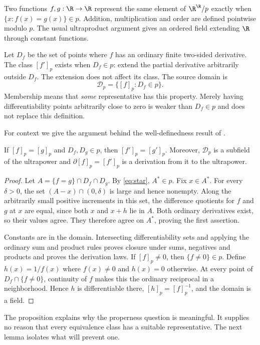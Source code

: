 \documentclass[11pt]{article}
\begin{document}
Two functions $f,g:\R\to\R$ represent the same element of
$\R^{\R}/p$ exactly when $\{x:f(x)=g(x)\}\in p$. Addition,
multiplication and order are defined pointwise modulo $p$. The usual
ultraproduct argument gives an ordered field extending $\R$ through
constant functions.

Let $D_f$ be the set of points where $f$ has an ordinary finite two-sided
derivative. The class $[f']_p$ exists when $D_f\in p$: extend the partial
derivative arbitrarily outside $D_f$. The extension does not affect its
class. The source domain is
\begin{equation}\label{eq:domain}
 \mathcal D_p=\{[f]_p:D_f\in p\}.
\end{equation}
Membership means that \emph{some} representative has this property.
Merely having differentiability points arbitrarily close to zero is
weaker than $D_f\in p$ and does not replace this definition.

For context we give the argument behind the well-definedness result
of \cite[Theorem~9]{AD}.

\begin{proposition}\label{prop:well-defined}
If $[f]_p=[g]_p$ and $D_f,D_g\in p$, then $[f']_p=[g']_p$.
Moreover, $\mathcal D_p$ is a subfield of the ultrapower and
$\partial[f]_p=[f']_p$ is a derivation from it to the ultrapower.
\end{proposition}
\begin{proof}
Let $A=\{f=g\}\cap D_f\cap D_g$. By \eqref{eq:star}, $A^*\in p$.
Fix $x\in A^*$. For every $\delta>0$, the set
$(A-x)\cap(0,\delta)$ is large and hence nonempty. Along the arbitrarily
small positive increments in this set, the difference quotients for
$f$ and $g$ at $x$ are equal, since both $x$ and $x+h$ lie in $A$.
Both ordinary derivatives exist, so their values agree. They therefore
agree on $A^*$, proving the first assertion.

Constants are in the domain. Intersecting differentiability sets and
applying the ordinary sum and product rules proves closure under sums,
negatives and products and proves the derivation laws. If $[f]_p\ne0$,
then $\{f\ne0\}\in p$. Define $h(x)=1/f(x)$ where $f(x)\ne0$ and
$h(x)=0$ otherwise. At every point of $D_f\cap\{f\ne0\}$, continuity
of $f$ makes this the ordinary reciprocal in a neighborhood. Hence $h$
is differentiable there, $[h]_p=[f]_p^{-1}$, and the domain is a field.
\end{proof}

The proposition explains why the properness question is meaningful.
It supplies no reason that every equivalence class has a suitable
representative. The next lemma isolates what will prevent one.
\end{document}
